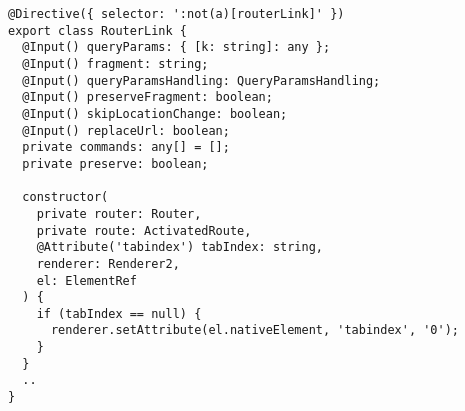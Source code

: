 \begin{verbatim}
@Directive({ selector: ':not(a)[routerLink]' })
export class RouterLink {
  @Input() queryParams: { [k: string]: any };
  @Input() fragment: string;
  @Input() queryParamsHandling: QueryParamsHandling;
  @Input() preserveFragment: boolean;
  @Input() skipLocationChange: boolean;
  @Input() replaceUrl: boolean;
  private commands: any[] = [];
  private preserve: boolean;

  constructor(
    private router: Router,
    private route: ActivatedRoute,
    @Attribute('tabindex') tabIndex: string,
    renderer: Renderer2,
    el: ElementRef
  ) {
    if (tabIndex == null) {
      renderer.setAttribute(el.nativeElement, 'tabindex', '0');
    }
  }
  ..
}
\end{verbatim}
